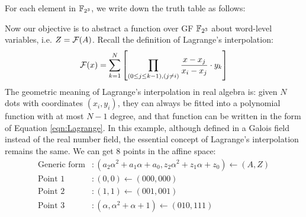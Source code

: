 \begin{Example}
For each element in $\F_{2^3}$, we write down the truth table as follows:
\begin{table}[H]
\label{tab:truthtable}
\caption{Truth table for mappings in $\mathbb{B}^3$ and $\F_{2^3}$}
\end{table}
Now our objective is to abstract a function over GF $\F_{2^3}$ about word-level variables, i.e. $Z = {\mathcal{F}}(A)$.
Recall the definition of Lagrange's interpolation:
\begin{equation}
\label{eqn:Lagrange}
{\mathcal{F}}(x) =  \sum_{k=1}^N \left[ \prod_{(0\leq j \leq k-1),(j\neq i)}\frac{x-x_j}{x_i-x_j} \cdot y_k \right]
\end{equation}
The geometric meaning of Lagrange's interpolation in real algebra is: given $N$ dots with coordinates $(x_i,y_i)$,
they can always be fitted into a polynomial function with at most $N-1$ degree, and that function can be 
written in the form of Equation \ref{eqn:Lagrange}. In this example, although defined in a Galois field instead of 
the real number field, the essential concept of Lagrange's interpolation remains the same. 
We can get 8 points in the affine space:
\begin{align*}
\text{Generic form}&: (a_2\alpha^2+a_1\alpha+a_0,z_2\alpha^2+z_1\alpha+z_0) \gets (A,Z) \\
\text{Point }1&: (0, 0) \gets (000,000) \\
\text{Point }2&: (1,1) \gets (001,001) \\
\text{Point }3&:  (\alpha,\alpha^2 + \alpha + 1) \gets (010,111)\\

\end{align*}
\end{Example}
